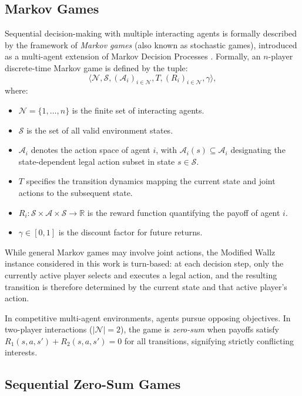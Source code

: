 \documentclass{article}
\begin{document}
\subsection{Markov Games}
\label{subsec:prelim_markov_games}

Sequential decision-making with multiple interacting agents is formally described by the framework of \emph{Markov games} (also known as stochastic games), introduced as a multi-agent extension of Markov Decision Processes \cite{littman1994markov}. Formally, an $n$-player discrete-time Markov game is defined by the tuple:
\begin{equation}
\big\langle \mathcal{N}, \mathcal{S}, (\mathcal{A}_i)_{i \in \mathcal{N}}, T, (R_i)_{i \in \mathcal{N}}, \gamma \big\rangle,
\end{equation}
where:
\begin{itemize}
    \item $\mathcal{N} = \{1, \dots, n\}$ is the finite set of interacting agents.
    \item $\mathcal{S}$ is the set of all valid environment states.
    \item $\mathcal{A}_i$ denotes the action space of agent $i$, with $\mathcal{A}_i(s) \subseteq \mathcal{A}_i$ designating the state-dependent legal action subset in state $s \in \mathcal{S}$.
    \item $T$ specifies the transition dynamics mapping the current state and joint actions to the subsequent state.
    \item $R_i : \mathcal{S} \times \mathcal{A} \times \mathcal{S} \rightarrow \mathbb{R}$ is the reward function quantifying the payoff of agent $i$.
    \item $\gamma \in [0, 1]$ is the discount factor for future returns.
\end{itemize}
While general Markov games may involve joint actions, the Modified Wallz instance considered in this work is turn-based: at each decision step, only the currently active player selects and executes a legal action, and the resulting transition is therefore determined by the current state and that active player's action.

In competitive multi-agent environments, agents pursue opposing objectives. In two-player interactions ($|\mathcal{N}| = 2$), the game is \emph{zero-sum} when payoffs satisfy $R_1(s, a, s') + R_2(s, a, s') = 0$ for all transitions, signifying strictly conflicting interests.

\subsection{Sequential Zero-Sum Games}
\label{subsec:prelim_sequential_games}
\end{document}
